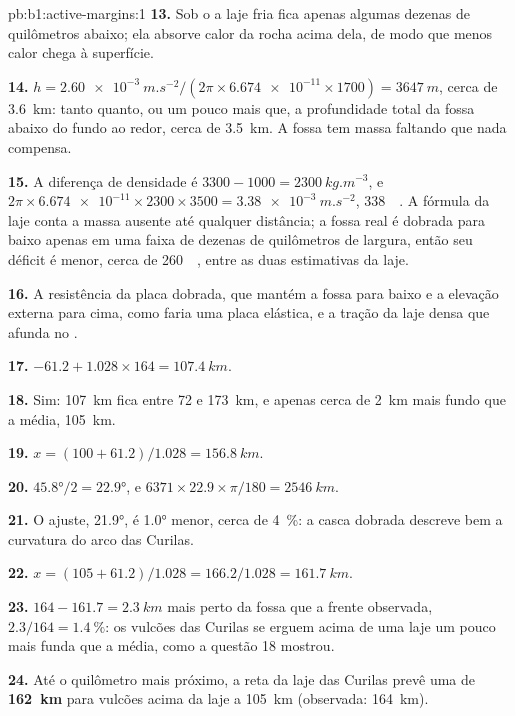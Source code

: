 \begin{solution}{pb:b1:active-margins:1}
\textbf{13.} Sob o  a laje fria fica apenas algumas dezenas de quilômetros abaixo; ela absorve calor da rocha acima dela, de modo que menos calor chega à superfície.

\textbf{14.} $h = \qty{2.60e-3}{m.s^{-2}}/(2\pi\times\num{6.674e-11}\times1700)
= \qty{3647}{m}$, cerca de \qty{3.6}{km}: tanto quanto, ou um pouco mais que, a
profundidade total da fossa abaixo do fundo ao redor, cerca de \qty{3.5}{km}. A
fossa tem massa faltando que nada compensa.

\textbf{15.} A diferença de densidade é $3300 - 1000 = \qty{2300}{kg.m^{-3}}$,
e $2\pi\times\num{6.674e-11}\times2300\times3500 = \qty{3.38e-3}{m.s^{-2}}$,
\qty{338}{\milli\gal}. A fórmula da laje conta a massa ausente até qualquer
distância; a fossa real é dobrada para baixo apenas em uma faixa de dezenas de quilômetros de largura, então seu déficit é menor, cerca de \qty{260}{\milli\gal}, entre as duas estimativas da laje.

\textbf{16.} A resistência da placa dobrada, que mantém a fossa para baixo e a elevação externa para cima, como faria uma placa elástica, e a tração da laje densa que afunda no .

\textbf{17.} $-61.2 + 1.028\times164 = \qty{107.4}{km}$.

\textbf{18.} Sim: \qty{107}{km} fica entre 72 e \qty{173}{km}, e apenas cerca de \qty{2}{km} mais fundo que a média, \qty{105}{km}.

\textbf{19.} $x = (100 + 61.2)/1.028 = \qty{156.8}{km}$.

\textbf{20.} $\ang{45.8}/2 = \ang{22.9}$, e
$6371\times22.9\times\pi/180 = \qty{2546}{km}$.

\textbf{21.} O ajuste, \ang{21.9}, é \ang{1.0} menor, cerca de
\qty{4}{\percent}: a casca dobrada descreve bem a curvatura do arco das Curilas.

\textbf{22.} $x = (105 + 61.2)/1.028 = 166.2/1.028 = \qty{161.7}{km}$.

\textbf{23.} $164 - 161.7 = \qty{2.3}{km}$ mais perto da fossa que a frente observada,
$2.3/164 = \qty{1.4}{\percent}$: os vulcões das Curilas se erguem acima de uma laje
um pouco mais funda que a média, como a questão 18 mostrou.

\textbf{24.} Até o quilômetro mais próximo, a reta da laje das Curilas prevê uma
 de \textbf{\qty[text-series-to-math=true]{162}{km}} para
vulcões acima da laje a \qty{105}{km} (observada: \qty{164}{km}).
\end{solution}
